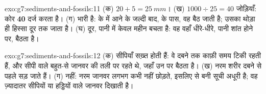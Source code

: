 \begin{solution}{exo:g7:sediments-and-fossils:11}
(क) $20 + 5 = \qty{25}{mm}$। (ख) $1000 \div 25 = 40$ जोड़ियाँ: कोर
\textbf{40 } दर्ज करता है। (ग)  भारी है:  के  में आने के जल्दी बाद,
 के पास, वह बैठ जाती है; उसका थोड़ा ही हिस्सा दूर तक जाता है। (घ) दूर, पानी
में केवल महीन  बचता है: वह वहाँ धीरे-धीरे, पानी शांत होने पर,
बैठता है।
\end{solution}

\begin{solution}{exo:g7:sediments-and-fossils:12}
(क) सीपियाँ सख़्त होती हैं: वे दबने तक काफ़ी समय टिकी रहती हैं, और सीपी वाले बहुत-से
जानवर  की तली पर रहते थे, जहाँ उन पर  बैठता है। (ख) नरम शरीर दबने से
पहले सड़ जाते हैं। (ग) नहीं: नरम जानवर लगभग कभी  नहीं छोड़ते, इसलिए
 से बनी सूची अधूरी है; वह ज़्यादातर सीपियों या हड्डियों वाले जानवर
दिखाती है।
\end{solution}

